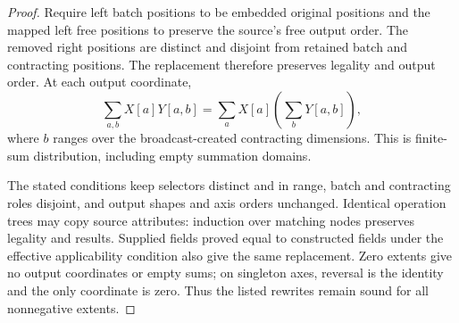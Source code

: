 \begin{proof}
Require left batch positions to be embedded original positions and the
mapped left free positions to preserve the source's free output order.
The removed right positions are distinct and disjoint from retained batch
and contracting positions. The replacement therefore preserves legality
and output order. At each output coordinate,
\[
 \sum_{a,b}X[a]Y[a,b]=\sum_a X[a]\left(\sum_bY[a,b]\right),
\]
where $b$ ranges over the broadcast-created contracting dimensions.
This is finite-sum distribution, including empty summation domains.

The stated conditions keep selectors distinct and in range, batch and
contracting roles disjoint, and output shapes and axis orders unchanged.
Identical operation trees may copy source attributes: induction over
matching nodes preserves legality and results. Supplied fields proved
equal to constructed fields under the effective applicability condition
also give the same replacement.
Zero extents give no output coordinates or empty sums; on singleton axes,
reversal is the identity and the only coordinate is zero.
Thus the listed rewrites remain sound for all nonnegative extents.
\end{proof}
